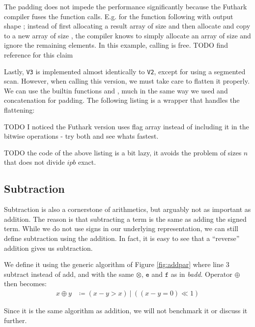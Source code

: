 

The padding does not impede the performance significantly because the Futhark
compiler fuses the function calls. E.g. for the function  
following  with output shape \fun{[n+p]}; instead of first
allocating a result array of size \fun{[n+p]} and then allocate and copy to a
new array of size \fun{[n]}, the compiler knows to simply allocate an array of
size \fun{[n]} and ignore the remaining  elements. In this example,
calling  is free. {\color{red} TODO find reference for this claim}

Lastly, \texttt{V3} is implemented almost identically to \texttt{V2}, except for
using a segmented scan. However, when calling this version, we must take care to
flatten it properly. We can use the builtin functions  and
, much in the same way we used  and concatenation for
padding. The following listing is a wrapper that handles the flattening:



{\color{red} TODO I noticed the Futhark version uses flag array instead of including it in the bitwise operations - try both and see whats fastest.}

{\color{red} TODO the code of the above listing is a bit lazy, it avoids the problem of sizes $n$ that does not divide $ipb$ exact.}

\subsection{Subtraction}
\label{subsec:sub}

Subtraction is also a cornerstone of arithmetics, but arguably not as important
as addition. The reason is that subtracting a term is the same as adding the
signed term. While we do not use signs in our underlying representation, we can
still define subtraction using the addition. In fact, it is easy to see that a
``reverse'' addition gives us subtraction.

We define it using the generic algorithm of Figure \ref{fig:addpar} where line 3
subtract instead of add, and with the same $\otimes$, $\mathtt{e}$ and
$\mathtt{f}$ as in \textit{badd}. Operator $\oplus$ then becomes:
\begin{align}
  \label{eq:oplusopt}
  x \oplus y &\coloneq (x - y > x)~|~((x - y = 0) \ll 1)
\end{align}

Since it is the same algorithm as addition, we will not benchmark it or discuss
it further.

